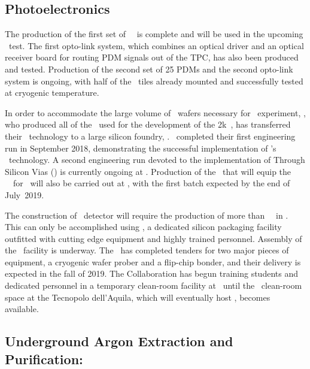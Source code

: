 \subsection{Photoelectronics}
\label{sec:PhotoElectronics}

The production of the first set of \DSkSQBPdmsNumber\ \DSkPdms\ is complete and will be used in the upcoming \DSzs\ test. The first opto-link system, which combines an optical driver and an optical receiver board for routing PDM signals out of the TPC, has also been produced and tested.  Production of the second set of 25 PDMs and the second opto-link system is ongoing, with half of the \SiPM\ tiles already mounted and successfully tested at cryogenic temperature.  

In order to accommodate the large volume of \SiPM\ wafers necessary for \DSks\ experiment, \FBK, who produced all of the \SiPMs\ used for the development of the \DS2k\ \DSkPdms, has transferred their \SiPM\ technology to a large silicon foundry, \LFoundry. \LFoundry\ completed their first engineering run in September 2018, demonstrating the successful implementation of  \FBK's \SiPM\ technology.  A second engineering run devoted to the implementation of Through Silicon Vias (\TSVs) is currently ongoing at \LFoundry. Production of the \SiPMs\ that will equip the \DSkPdmsSecondBatchNumber~\DSkPdms\ for \DSps\ will also be carried out at \LFoundry, with the first batch expected by the end of July~2019.

The construction of \DSks\ detector will require the production of more than \DSkPdmsNumber\ \DSkPdms\ in \DSkPdmsContructionTime.  This can only be accomplished using \NOA, a dedicated silicon packaging facility outfitted with cutting edge equipment and highly trained personnel.  Assembly of the \NOA\ facility is underway. The \INFN\ has completed tenders for two major pieces of equipment, a cryogenic wafer prober and a flip-chip bonder, and their delivery is expected in the fall of 2019.  The Collaboration has begun training students and dedicated personnel in a temporary clean-room facility at \LNGS\ until the \DSkPdmsCleanRoomSurface\ clean-room space at the Tecnopolo dell'Aquila, which will eventually host \NOA, becomes available.


\subsection{Underground Argon Extraction and Purification: \Urania}
\label{sec:Urania}

